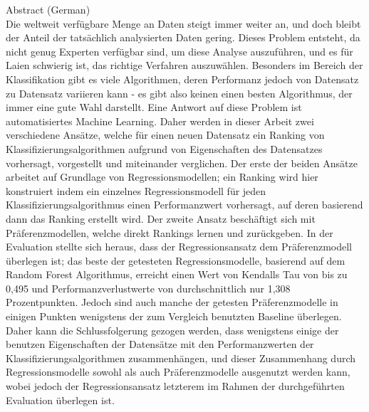 {Abstract (German)}\label{sec:abstract-german} \\

Die weltweit verfügbare Menge an Daten steigt immer weiter an, und doch bleibt der Anteil der tatsächlich analysierten Daten gering. Dieses Problem entsteht, da nicht genug Experten verfügbar sind, um diese Analyse auszuführen, und es für Laien schwierig ist, das richtige Verfahren auszuwählen. Besonders im Bereich der Klassifikation gibt es viele Algorithmen, deren Performanz jedoch von Datensatz zu Datensatz variieren kann - es gibt also keinen einen besten Algorithmus, der immer eine gute Wahl darstellt. Eine Antwort auf diese Problem ist automatisiertes Machine Learning. Daher werden in dieser Arbeit zwei verschiedene Ansätze, welche für einen neuen Datensatz ein Ranking von Klassifizierungsalgorithmen aufgrund von Eigenschaften des Datensatzes vorhersagt, vorgestellt und miteinander verglichen. Der erste der beiden Ansätze arbeitet auf Grundlage von Regressionsmodellen; ein Ranking wird hier konstruiert indem ein einzelnes Regressionsmodell für jeden Klassifizierungsalgorithmus einen Performanzwert vorhersagt, auf deren basierend dann das Ranking erstellt wird. Der zweite Ansatz beschäftigt sich mit Präferenzmodellen, welche direkt Rankings lernen und zurückgeben. In der Evaluation stellte sich heraus, dass der Regressionsansatz dem Präferenzmodell überlegen ist; das beste der getesteten Regressionsmodelle, basierend auf dem Random Forest Algorithmus, erreicht einen Wert von Kendalls Tau von bis zu 0,495 und Performanzverlustwerte von durchschnittlich nur 1,308 Prozentpunkten. Jedoch sind auch manche der getesten Präferenzmodelle in einigen Punkten wenigstens der zum Vergleich benutzten Baseline überlegen. Daher kann die Schlussfolgerung gezogen werden, dass wenigstens einige der benutzen Eigenschaften der Datensätze mit den Performanzwerten der Klassifizierungsalgorithmen zusammenhängen, und dieser Zusammenhang durch Regressionsmodelle sowohl als auch Präferenzmodelle ausgenutzt werden kann, wobei jedoch der Regressionsansatz letzterem im Rahmen der durchgeführten Evaluation überlegen ist.